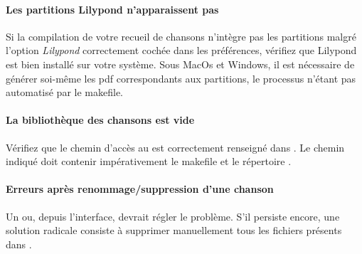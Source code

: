 \paragraph{Les partitions Lilypond n'apparaissent pas}
Si la compilation de votre recueil de chansons n'intègre pas les
partitions malgré l'option \emph{Lilypond} correctement cochée dans
les préférences, vérifiez que Lilypond est bien installé sur votre
système. Sous MacOs et Windows, il est nécessaire de générer soi-même
les pdf correspondants aux partitions, le processus n'étant pas
automatisé par le makefile.

\paragraph{La bibliothèque des chansons est vide} 
Vérifiez que le chemin d'accès au \songbook est correctement
renseigné dans . Le chemin indiqué doit contenir
impérativement le makefile et le répertoire .

\paragraph{Erreurs après renommage/suppression d'une chanson} 
Un  ou, depuis l'interface,  devrait
régler le problème. S'il persiste encore, une solution radicale
consiste à supprimer manuellement tous les fichiers  présents
dans .
